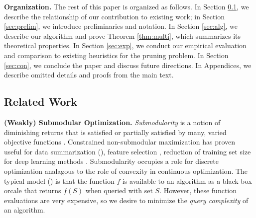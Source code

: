  \textbf{Organization.} The rest of this paper
 is organized as follows. In Section \ref{sec:related-work},
 we describe the relationship of our contribution to existing
 work; in Section \ref{sec:prelim}, we introduce preliminaries
 and notation. In Section \ref{sec:alg}, we describe our
 \qs algorithm and prove Theorem \ref{thm:multi}, which
 summarizes its theoretical properties. In Section \ref{sec:exp},
 we conduct our empirical evaluation and comparison to existing
 heuristics for the pruning problem. In Section \ref{sec:con},
 we conclude the paper and discuss future directions.
 In Appendices, we describe omitted details and proofs from the main text.

\subsection{Related Work} \label{sec:related-work}
\textbf{(Weakly) Submodular Optimization.}
\textit{Submodularity} is a notion of diminishing
returns that is satisfied or partially satisfied
by many, varied objective functions \citep{Demeniconi2021, Feige, Feige1996, Feige2011, Feige2011a, Feige2013, Gharan2010, Gharan2011, Gharan2011a, Gharan2011b, Gupta2010a, Khot2001, Kothawade2022, Lee2009, Nemhauser1978b, Uziahu2023, Vondrak2013}.
Constrained non-submodular maximization has proven useful for
data summarization (\eg \citep{Demeniconi2021,Kothawade2022}), feature selection \citep{Elenberg2018},
reduction of training set size 
for deep learning methods \citep{Killamsetty2023}.
Submodularity occupies a role for discrete optimization
analagous to the role of convexity in continuous optimization.
The typical model (\eg \citep{Feige, Gharan2011a, Gupta2010a}) is that the function $f$ is
available to an algorithm as a black-box orcale
that returns $f(S)$ when queried with set $S$. However,
these function evaluations are very expensive, so we
desire to minimize the \textit{query complexity} of an algorithm. 

